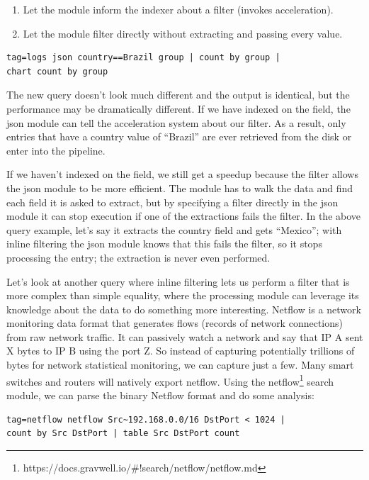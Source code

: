 \begin{enumerate}
\item
  Let the  module inform the indexer about a filter (invokes
  acceleration).
\item
  Let the  module filter directly without extracting and
  passing every value.
\end{enumerate}

\begin{Verbatim}[breaklines=true]
tag=logs json country==Brazil group | count by group |
chart count by group
\end{Verbatim}

The new query doesn't look much different and the output is identical,
but the performance may be dramatically different. If we have indexed
on the  field, the json module can tell the acceleration system
about our filter. As a result, only entries that have a country value of
``Brazil'' are ever retrieved from the disk or enter into the
pipeline.

If we haven't indexed on the  field, we still get a speedup
because the filter allows the json module to be more efficient. The
 module has to walk the data and find each field it is asked to
extract, but by specifying a filter directly in the json module it can
stop execution if one of the extractions fails the filter. In the above
query example, let's say it extracts the country field and gets ``Mexico'';
with inline filtering the json module knows that this fails the
filter, so it stops processing the entry; the  extraction is
never even performed.

Let's look at another query where inline
filtering lets us perform a filter that is more complex than simple
equality, where the processing module can leverage its knowledge about
the data to do something more interesting. Netflow is a network monitoring data format that generates flows
(records of network connections) from raw network traffic. It can passively watch a network and say that
IP A sent X bytes to IP B using the port Z. So instead of capturing
potentially trillions of bytes for network statistical monitoring, we can
capture just a few. Many smart switches and routers will natively
export netflow.
Using the netflow\footnote{https://docs.gravwell.io/\#!search/netflow/netflow.md} search
module, we can parse the binary Netflow format and do some analysis:

\begin{Verbatim}[breaklines=true]
tag=netflow netflow Src~192.168.0.0/16 DstPort < 1024 |
count by Src DstPort | table Src DstPort count
\end{Verbatim}

